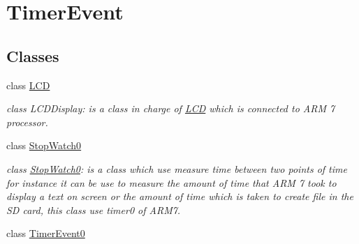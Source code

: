 \hypertarget{group__group1}{
\section{TimerEvent}
\label{da/d1f/group__group1}
}
\subsection*{Classes}
\begin{DoxyCompactItemize}
\item 
class \hyperlink{class_l_c_d}{LCD}
\begin{DoxyCompactList}\small\item\em class LCDDisplay: is a class in charge of \hyperlink{class_l_c_d}{LCD} which is connected to ARM 7 processor. \end{DoxyCompactList}\item 
class \hyperlink{class_stop_watch0}{StopWatch0}
\begin{DoxyCompactList}\small\item\em class \hyperlink{class_stop_watch0}{StopWatch0}: is a class which use measure time between two points of time for instance it can be use to measure the amount of time that ARM 7 took to display a text on screen or the amount of time which is taken to create file in the SD card, this class use timer0 of ARM7. \end{DoxyCompactList}\item 
class \hyperlink{class_timer_event0}{TimerEvent0}
\end{DoxyCompactItemize}
